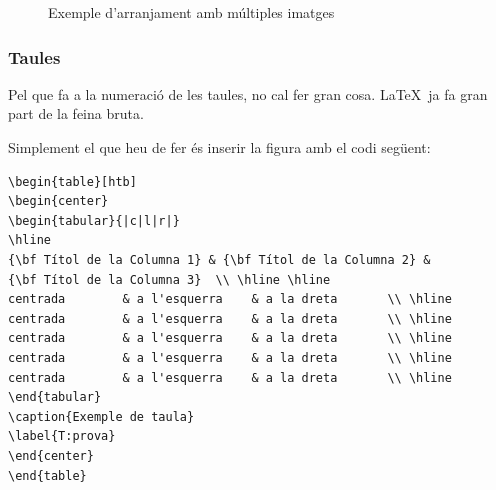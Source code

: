 \begin{figure}[htb]
  \begin{center}
    \begin{subfigmatrix}{3}
    \end{subfigmatrix}
    \caption{Exemple d'arranjament amb múltiples imatges}
    \label{F:prova2}
  \end{center}
\end{figure}



\subsubsection{Taules}

Pel que fa a la numeració de les taules, no cal fer gran cosa. \LaTeX \ ja fa gran part de la feina bruta. 

Simplement el que heu de fer és inserir la figura amb el codi següent:

\begin{verbatim}
\begin{table}[htb]
\begin{center}
\begin{tabular}{|c|l|r|}
\hline
{\bf Títol de la Columna 1} & {\bf Títol de la Columna 2} & 
{\bf Títol de la Columna 3}  \\ \hline \hline
centrada        & a l'esquerra    & a la dreta       \\ \hline
centrada        & a l'esquerra    & a la dreta       \\ \hline
centrada        & a l'esquerra    & a la dreta       \\ \hline
centrada        & a l'esquerra    & a la dreta       \\ \hline
centrada        & a l'esquerra    & a la dreta       \\ \hline
\end{tabular}
\caption{Exemple de taula}
\label{T:prova}
\end{center}
\end{table}
\end{verbatim}

